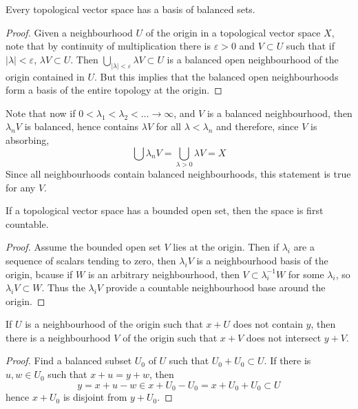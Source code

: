 \begin{theorem}
    Every topological vector space has a basis of balanced sets.
\end{theorem}
\begin{proof}
    Given a neighbourhood $U$ of the origin in a topological vector space $X$, note that by continuity of multiplication there is $\varepsilon > 0$ and $V \subset U$ such that if $|\lambda| < \varepsilon$, $\lambda V \subset U$. Then $\bigcup_{|\lambda| < \varepsilon} \lambda V \subset U$ is a balanced open neighbourhood of the origin contained in $U$. But this implies that the balanced open neighbourhoods form a basis of the entire topology at the origin.
\end{proof}

Note that now if $0 < \lambda_1 < \lambda_2 < \dots \to \infty$, and $V$ is a balanced neighbourhood, then $\lambda_n V$ is balanced, hence contains $\lambda V$ for all $\lambda < \lambda_n$ and therefore, since $V$ is absorbing,
%
\[ \bigcup \lambda_n V = \bigcup_{\lambda > 0} \lambda V = X \]
%
Since all neighbourhoods contain balanced neighbourhoods, this statement is true for any $V$.

\begin{prop}
    If a topological vector space has a bounded open set, then the space is first countable.
\end{prop}
\begin{proof}
    Assume the bounded open set $V$ lies at the origin. Then if $\lambda_i$ are a sequence of scalars tending to zero, then $\lambda_i V$ is a neighbourhood basis of the origin, bcause if $W$ is an arbitrary neighbourhood, then $V \subset \lambda_i^{-1} W$ for some $\lambda_i$, so $\lambda_i V \subset W$. Thus the $\lambda_i V$ provide a countable neighbourhood base around the origin.
\end{proof}

\begin{lemma}
    If $U$ is a neighbourhood of the origin such that $x + U$ does not contain $y$, then there is a neighbourhood $V$ of the origin such that $x + V$ does not intersect $y + V$.
\end{lemma}
\begin{proof}
    Find a balanced subset $U_0$ of $U$ such that $U_0 + U_0 \subset U$. If there is $u,w \in U_0$ such that $x + u = y + w$, then
    \[ y = x + u - w \in x + U_0 - U_0 = x + U_0 + U_0 \subset U \]
    hence $x + U_0$ is disjoint from $y + U_0$.
\end{proof}

